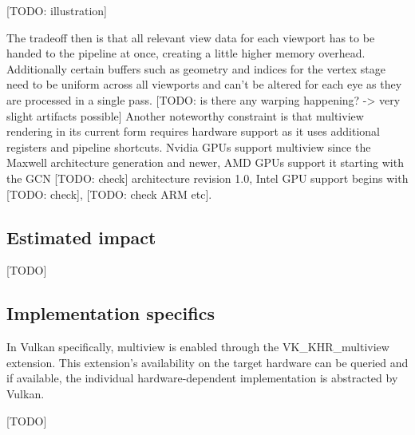 [TODO: illustration]

The tradeoff then is that all relevant view data for each viewport has to be handed to the pipeline at once, creating a little higher memory overhead. Additionally certain buffers such as geometry and indices for the vertex stage need to be uniform across all viewports and can't be altered for each eye as they are processed in a single pass. 
[TODO: is there any warping happening? -> very slight artifacts possible]
Another noteworthy constraint is that multiview rendering in its current form requires hardware support as it uses additional registers and pipeline shortcuts. Nvidia GPUs support multiview since the Maxwell architecture generation and newer, AMD GPUs support it starting with the GCN [TODO: check] architecture revision 1.0, Intel GPU support begins with [TODO: check], [TODO: check ARM etc]. 

\subsection{Estimated impact}
[TODO]

\subsection{Implementation specifics}
In Vulkan specifically, multiview is enabled through the VK\_KHR\_multiview extension. This extension's availability on the target hardware can be queried and if available, the individual hardware-dependent implementation is abstracted by Vulkan. 

[TODO]
